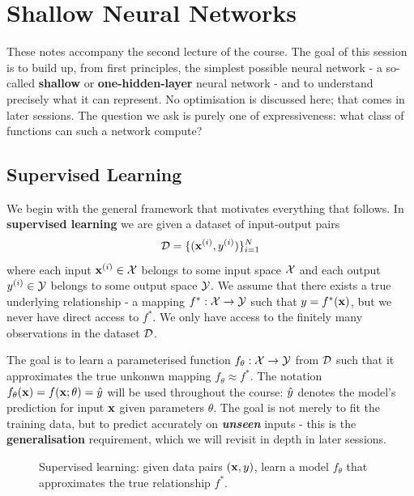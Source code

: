 \section{Shallow Neural Networks}

These notes accompany the second lecture of the course. The goal of this session is to build up, from first principles, the simplest possible neural network - a so-called \textbf{shallow} or \textbf{one-hidden-layer} neural network - and to understand precisely what it can represent. No optimisation is discussed here; that comes in later sessions. The question we ask is purely one of expressiveness: what class of functions can such a network compute?

\subsection{Supervised Learning}

We begin with the general framework that motivates everything that follows. In \textbf{supervised learning} we are given a dataset of input-output pairs
\begin{equation}
 \mathcal{D} = \{(\mathbf{x}^{(i)}, y^{(i)})\}_{i=1}^{N}
\end{equation}
where each input $\mathbf{x}^{(i)} \in \mathcal{X}$ belongs to some input space $\mathcal{X}$ and each output $y^{(i)} \in \mathcal{Y}$ belongs to some output space $\mathcal{Y}$. We assume that there exists a true underlying relationship - a mapping $f^*: \mathcal{X} \to \mathcal{Y}$ such that $y = f^*(\mathbf{x})$, but we never have direct access to $f^*$. We only have access to the finitely many observations in the dataset $\mathcal{D}$.

The goal is to learn a parameterised function $f_\theta: \mathcal{X} \to \mathcal{Y}$ from $\mathcal{D}$ such that it approximates the true unkonwn mapping $f_\theta \approx f^*$. The notation $f_\theta(\mathbf{x}) = f(\mathbf{x}; \theta) = \hat{y}$ will be used throughout the course: $\hat{y}$ denotes the model's prediction for input $\mathbf{x}$ given parameters $\theta$. The goal is not merely to fit the training data, but to predict accurately on \textit{\textbf{unseen}} inputs - this is the \textbf{generalisation} requirement, which we will revisit in depth in later sessions.

\begin{figure}[h]
 \centering
 \resizebox{0.7\textwidth}{!}{}
 \caption{Supervised learning: given data pairs $(\mathbf{x}, y)$, learn a model $f_\theta$ that approximates the true relationship $f^*$.}
 \label{fig:supervised_learning}
\end{figure}

